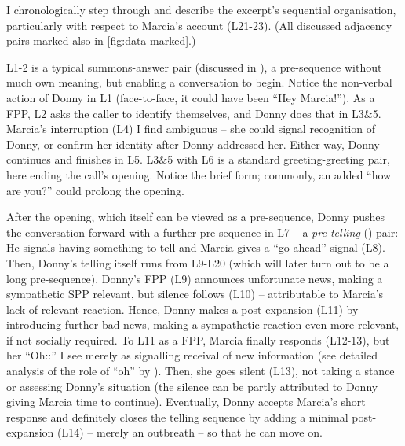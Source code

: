\documentclass[11pt]{article}
\begin{document}
{	%
	I chronologically step through and describe the excerpt's sequential organisation, particularly with respect to Marcia's account (L21-23). (All discussed adjacency pairs marked also in \autoref{fig:data-marked}.)

	L1-2 is a typical summons-answer pair (discussed in \citet[p.~126]{Liddicoat_2007}), a pre-sequence without much own meaning, but enabling a conversation to begin. Notice the non-verbal action of Donny in L1 (face-to-face, it could have been ``Hey Marcia!'').
	As a FPP, L2 asks the caller to identify themselves, and Donny does that in L3\&5.
	Marcia's interruption (L4) I find ambiguous -- she could signal recognition of Donny, or confirm her identity after Donny addressed her. Either way, Donny continues and finishes in L5.
	L3\&5 with L6 is a standard greeting-greeting pair, here ending the call's opening. Notice the brief form; commonly, an added ``how are you?'' could prolong the opening.

	After the opening, which itself can be viewed as a pre-sequence, Donny pushes the conversation forward with a further pre-sequence in L7 -- a \textit{pre-telling} (\citeauthor[p.~136]{Liddicoat_2007}) pair: He signals having something to tell and Marcia gives a ``go-ahead'' signal (L8).
	Then, Donny's telling itself runs from L9-L20 (which will later turn out to be a long pre-sequence). 
	Donny's FPP (L9) announces unfortunate news, making a sympathetic SPP relevant, but silence follows (L10) -- attributable to Marcia's lack of relevant reaction.
	Hence, Donny makes a post-expansion (L11) by introducing further bad news, making a sympathetic reaction even more relevant, if not socially required.
	To L11 as a FPP, Marcia finally responds (L12-13), but her ``Oh::'' I see merely as signalling receival of new information (see detailed analysis of the role of ``oh'' by \citet{Heritage_1984}). Then, she goes silent (L13), not taking a stance or assessing Donny's situation (the silence can be partly attributed to Donny giving Marcia time to continue).
	Eventually,	Donny accepts Marcia's short response and definitely closes the telling sequence by adding a minimal post-expansion (L14) -- merely an outbreath -- so that he can move on.

}
\end{document}
